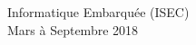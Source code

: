 \begin{titlepage}

{\large Informatique Embarquée (ISEC)}\\[10pt]


{\large Mars à Septembre 2018}\\[2cm] %


 

\vfill %

\end{titlepage}


%
%
%
%
%    
%
%
